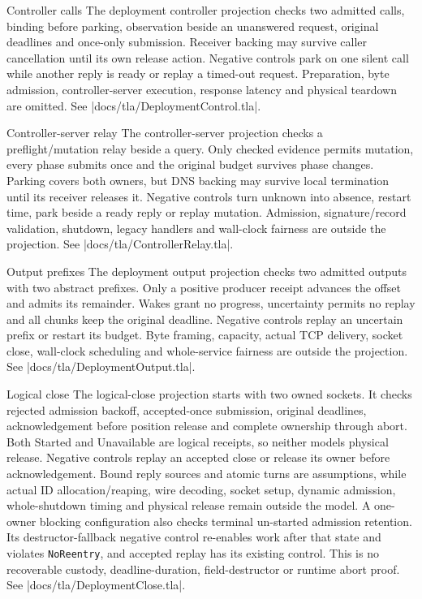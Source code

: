 \begin{implementationdetail}{Controller calls}
The deployment controller projection checks two admitted calls, binding before
parking, observation beside an unanswered request, original deadlines and
once-only submission. Receiver backing may survive caller cancellation until
its own release action. Negative controls park on one silent call while another
reply is ready or replay a timed-out request. Preparation, byte admission,
controller-server execution, response latency and physical teardown are omitted.
See \repofile|docs/tla/DeploymentControl.tla|.
\end{implementationdetail}

\begin{implementationdetail}{Controller-server relay}
The controller-server projection checks a preflight/mutation relay beside a
query. Only checked evidence permits mutation, every phase submits once and the
original budget survives phase changes. Parking covers both owners, but DNS backing
may survive local termination until its receiver releases it. Negative controls
turn unknown into absence, restart time, park beside a ready reply or replay
mutation. Admission, signature/record validation, shutdown, legacy handlers and
wall-clock fairness are outside the projection. See
\repofile|docs/tla/ControllerRelay.tla|.
\end{implementationdetail}

\begin{implementationdetail}{Output prefixes}
The deployment output projection checks two admitted outputs with two abstract
prefixes. Only a positive producer receipt advances the offset and admits its
remainder. Wakes grant no progress, uncertainty permits no replay and all chunks
keep the original deadline. Negative controls replay an uncertain prefix or
restart its budget. Byte framing, capacity, actual TCP delivery, socket close,
wall-clock scheduling and whole-service fairness are outside the projection.
See \repofile|docs/tla/DeploymentOutput.tla|.
\end{implementationdetail}

\begin{implementationdetail}{Logical close}
The logical-close projection starts with two owned sockets. It checks rejected
admission backoff, accepted-once submission, original deadlines, acknowledgement
before position release and complete ownership through abort. Both Started and
Unavailable are logical receipts, so neither models physical release. Negative controls
replay an accepted close or release its owner before acknowledgement. Bound reply
sources and atomic turns are assumptions, while actual ID allocation/reaping, wire
decoding, socket setup, dynamic
admission, whole-shutdown timing and physical release remain outside the model.
A one-owner blocking configuration also checks terminal un-started admission
retention. Its destructor-fallback negative control re-enables work after that
state and violates \texttt{NoReentry}, and accepted replay has its existing control.
This is no recoverable custody, deadline-duration, field-destructor or runtime
abort proof. See \repofile|docs/tla/DeploymentClose.tla|.
\end{implementationdetail}

